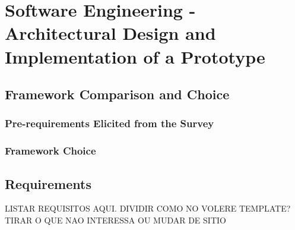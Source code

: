 \chapter{Software Engineering - Architectural Design and Implementation of a Prototype}
\label{chap:prototype}
\minitoc \mtcskip \noindent 


\section{Framework Comparison and Choice}
\subsection{Pre-requirements Elicited from the Survey}

\subsection{Framework Choice}



\section{Requirements}

LISTAR REQUISITOS AQUI. DIVIDIR COMO NO VOLERE TEMPLATE? TIRAR O QUE NAO INTERESSA OU MUDAR DE SITIO

